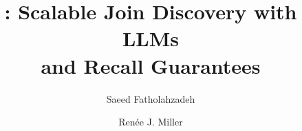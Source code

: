 \documentclass[sigconf, screen, nonacm, pdfa]{acmart}
\begin{document}
\title[\ourmethod: Scalable Join Discovery with LLMs and Recall Guarantees]{\ourmethod: Scalable Join Discovery with LLMs\\ and Recall Guarantees}

\author{Saeed Fatholahzadeh}

\author{Ren\'ee J. Miller}



\maketitle
\vldbtopmatter







\balance


\end{document}
